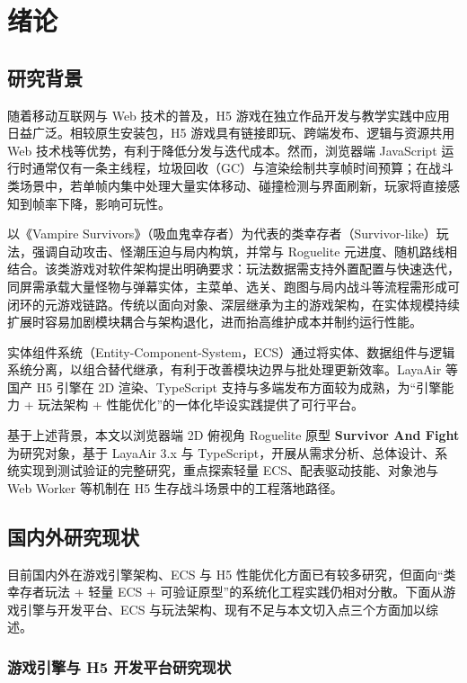 \chapter{绪论}
\label{chap:intro}

\section{研究背景}

随着移动互联网与 Web 技术的普及，H5 游戏在独立作品开发与教学实践中应用日益广泛。相较原生安装包，H5 游戏具有链接即玩、跨端发布、逻辑与资源共用 Web 技术栈等优势，有利于降低分发与迭代成本。然而，浏览器端 JavaScript 运行时通常仅有一条主线程，垃圾回收（GC）与渲染绘制共享帧时间预算；在战斗类场景中，若单帧内集中处理大量实体移动、碰撞检测与界面刷新，玩家将直接感知到帧率下降，影响可玩性。

以《Vampire Survivors》（吸血鬼幸存者）为代表的类幸存者（Survivor-like）玩法，强调自动攻击、怪潮压迫与局内构筑，并常与 Roguelite 元进度、随机路线相结合。该类游戏对软件架构提出明确要求：玩法数据需支持外置配置与快速迭代，同屏需承载大量怪物与弹幕实体，主菜单、选关、跑图与局内战斗等流程需形成可闭环的元游戏链路。传统以面向对象、深层继承为主的游戏架构，在实体规模持续扩展时容易加剧模块耦合与架构退化，进而抬高维护成本并制约运行性能\cite{baabad2020degradation}。

实体组件系统（Entity-Component-System，ECS）通过将实体、数据组件与逻辑系统分离，以组合替代继承，有利于改善模块边界与批处理更新效率。LayaAir 等国产 H5 引擎在 2D 渲染、TypeScript 支持与多端发布方面较为成熟，为“引擎能力 + 玩法架构 + 性能优化”的一体化毕设实践提供了可行平台。

基于上述背景，本文以浏览器端 2D 俯视角 Roguelite 原型 \textbf{Survivor And Fight} 为研究对象，基于 LayaAir 3.x 与 TypeScript，开展从需求分析、总体设计、系统实现到测试验证的完整研究，重点探索轻量 ECS、配表驱动技能、对象池与 Web Worker 等机制在 H5 生存战斗场景中的工程落地路径。

\section{国内外研究现状}

目前国内外在游戏引擎架构、ECS 与 H5 性能优化方面已有较多研究，但面向“类幸存者玩法 + 轻量 ECS + 可验证原型”的系统化工程实践仍相对分散。下面从游戏引擎与开发平台、ECS 与玩法架构、现有不足与本文切入点三个方面加以综述。

\subsection{游戏引擎与 H5 开发平台研究现状}

